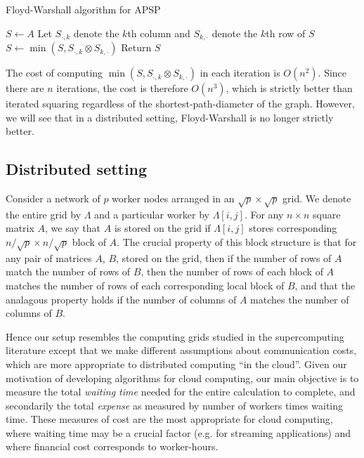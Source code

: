 \documentclass{article} %
\begin{document}
\begin{algorithm}[H]
\caption{Floyd-Warshall algorithm for APSP}
\begin{algorithmic}
  \State $S \leftarrow A$
    \State Let $S_{\cdot, k}$ denote the $k$th column and $S_{k, \cdot}$ denote the $k$th row of $S$
    \State $S \leftarrow \min(S, S_{\cdot, k} \otimes S_{k, \cdot})$
  \EndFor
  \State Return $S$
\EndFunction
\end{algorithmic}
\end{algorithm}

The cost of computing $\min(S, S_{\cdot, k} \otimes S_{k, \cdot})$ in
each iteration is $O(n^2)$.  Since there are $n$ iterations, the cost
is therefore $O(n^3)$, which is strictly better than iterated squaring
regardless of the shortest-path-diameter of the graph.  However, we
will see that in a distributed setting, Floyd-Warshall is no longer
strictly better.

\subsection{Distributed setting}

Consider a network of $p$ worker nodes arranged in an $\sqrt{p} \times
\sqrt{p}$ grid.  We denote the entire grid by $\Lambda$ and a
particular worker by $\Lambda[i,j]$.  For any $n \times n$ square
matrix $A$, we say that $A$ is stored on the grid if $\Lambda[i,j]$
stores corresponding $n/\sqrt{p} \times n/\sqrt{p}$ block of $A$.  The
crucial property of this block structure is that for any pair of
matrices $A$, $B$, stored on the grid, then if the number of rows of
$A$ match the number of rows of $B$, then the number of rows of each
block of $A$ matches the number of rows of each corresponding local
block of $B$, and that the analagous property holds if the number of
columns of $A$ matches the number of columns of $B$.

Hence our setup resembles the computing grids studied in the
supercomputing literature\cite{Kumar1991} except that we make
different assumptions about communication costs, which are more
appropriate to distributed computing ``in the cloud''.  Given our
motivation of developing algorithms for cloud computing, our main
objective is to measure the total \emph{waiting time} needed for the
entire calculation to complete, and secondarily the total
\emph{expense} as measured by number of workers times waiting time.
These measures of cost are the most appropriate for cloud computing,
where waiting time may be a crucial factor (e.g. for streaming
applications) and where financial cost corresponds to worker-hours.
\end{document}

